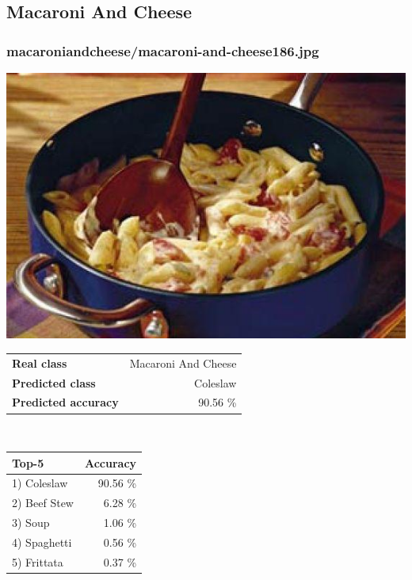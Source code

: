 \subsection{Macaroni And Cheese}
    
\subsubsection{macaroni\textunderscore and\textunderscore cheese/macaroni-and-cheese186.jpg}

\begin{minipage}[t]{0.4\textwidth}
	\vspace{0pt}
	\includegraphics[width=\linewidth]{images/evaluation-images/macaroni_and_cheese/macaroni-and-cheese186.jpg}
\end{minipage}
\hfill
\begin{minipage}[t]{0.5\textwidth}
	\vspace{0pt}\raggedright
	\begin{tabularx}{\textwidth}{X r}
		\small \textbf{Real class} & \small Macaroni And Cheese\\
		\small \textbf{Predicted class} & \small Coleslaw\\
		\small \textbf{Predicted accuracy} & \small 90.56 \%
    \end{tabularx}\\
    
    \vspace{6pt}
	\begin{tabularx}{\textwidth}{X r}
        \small \textbf{Top-5} & \small \textbf{Accuracy} \\
        \hline
		\small 1) Coleslaw & \small 90.56 \%\\\small 2) Beef Stew & \small 6.28 \%\\\small 3) Soup & \small 1.06 \%\\\small 4) Spaghetti & \small 0.56 \%\\\small 5) Frittata & \small 0.37 \%
    \end{tabularx}
\end{minipage}
    
